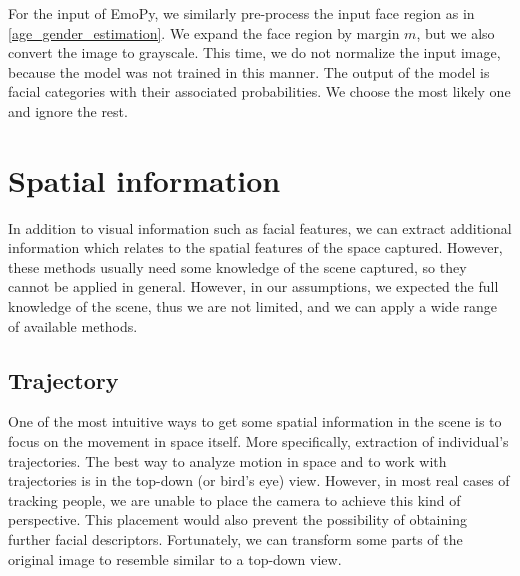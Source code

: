             For the input of EmoPy, we similarly pre-process the input face region as in \ref{age_gender_estimation}. We expand the face region by margin $m$, but we also convert the image to grayscale. This time, we do not normalize the input image, because the model was not trained in this manner. The output of the model is facial categories with their associated probabilities. We choose the most likely one and ignore the rest.
        
    \section{Spatial information}
        In addition to visual information such as facial features, we can extract additional information which relates to the spatial features of the space captured. However, these methods usually need some knowledge of the scene captured, so they cannot be applied in general. However, in our assumptions, we expected the full knowledge of the scene, thus we are not limited, and we can apply a wide range of available methods.
        
        \subsection{Trajectory}
            One of the most intuitive ways to get some spatial information in the scene is to focus on the movement in space itself. More specifically, extraction of individual's trajectories. The best way to analyze motion in space and to work with trajectories is in the top-down (or bird's eye) view. However, in most real cases of tracking people, we are unable to place the camera to achieve this kind of perspective. This placement would also prevent the possibility of obtaining further facial descriptors. Fortunately, we can transform some parts of the original image to resemble similar to a top-down view. 
            
